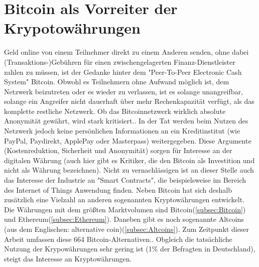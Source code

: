 \section{Bitcoin als Vorreiter der Krypotowährungen}\label{sec:cryptocurrency}
Geld online von einem Teilnehmer direkt zu einem Anderen senden, ohne dabei (Transaktions-)Gebühren für einen zwischengelagerten Finanz-Dienstleister zahlen zu müssen, ist der Gedanke hinter dem "Peer-To-Peer Electronic Cash System"\citep{nakamoto_bitcoin:_2008} Bitcoin. Obwohl es Teilnehmern ohne Aufwand möglich ist, dem Netzwerk beizutreten oder es wieder zu verlassen, ist es solange unangreifbar, solange ein Angreifer nicht dauerhaft über mehr Rechenkapazität verfügt, als das komplette restliche Netzwerk.\citep{nakamoto_bitcoin:_2008} Ob das Bitcoinnetzwerk wirklich absolute Anonymität gewährt, wird stark kritisiert.\citep{reid_analysis_2013,androulaki_evaluating_2013}. In der Tat werden beim Nutzen des Netzwerk jedoch keine persönlichen Informationen an ein Kreditinstitut (wie PayPal, Paydirekt, ApplePay oder Masterpass) weitergegeben. Diese Argumente (Kostenreduktion, Sicherheit und Anonymität) sorgen für Interesse an der digitalen Währung (auch hier gibt es Kritiker, die den Bitcoin als Investition und nicht als Währung bezeichnen)\citep{baur_bitcoin:_2015}. Nicht zu vernachlässigen ist an dieser Stelle auch das Interesse der Industrie an "Smart Contracts"\citep[S.~10]{dannen_introducing_2017}, die beispielsweise im Bereich des Internet of Things Anwendung finden.\citep{christidis_blockchains_2016}\newline
Neben Bitcoin hat sich deshalb zusätzlich eine Vielzahl an anderen sogenannten Kryptowährungen entwickelt. Die Währungen mit dem größten Marktvolumen sind  Bitcoin(\ref{subsec:Bitcoin}) und Ethereum(\ref{subsec:Ethereum})\citep{wood_ethereum:_2014}.\citep{brandt_infografik:_2017, coinmarketcap_ranking_2017} Daneben gibt es noch sogenannte Altcoins (aus dem Englischen: alternative coin\citep{prableen_bajpai_altcoin_2014})(\ref{subsec:Altcoins}). Zum Zeitpunkt dieser Arbeit umfassen diese 664 Bitcoin-Alternativen.\citep{coindesk_anzahl_2017}. Obgleich die tatsächliche Nutzung der Krypowährungen sehr gering ist (1\% der Befragten in Deutschland\citep{tsys_kennen_2016}), steigt das Interesse an Kryptowährungen\citep{wikitrends_compare_2017,googletrends_googletrends_2017}.\newline
{}

